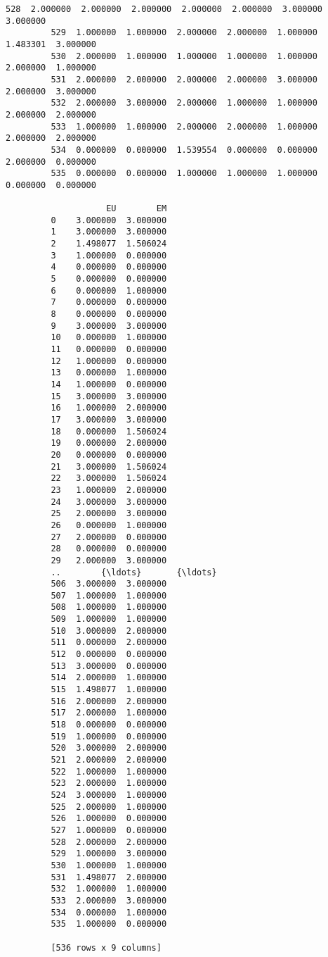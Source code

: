 \documentclass[11pt]{article}
\begin{document}
\begin{Verbatim}[commandchars=\\\{\}]
         528  2.000000  2.000000  2.000000  2.000000  2.000000  3.000000  3.000000   
         529  1.000000  1.000000  2.000000  2.000000  1.000000  1.483301  3.000000   
         530  2.000000  1.000000  1.000000  1.000000  1.000000  2.000000  1.000000   
         531  2.000000  2.000000  2.000000  2.000000  3.000000  2.000000  3.000000   
         532  2.000000  3.000000  2.000000  1.000000  1.000000  2.000000  2.000000   
         533  1.000000  1.000000  2.000000  2.000000  1.000000  2.000000  2.000000   
         534  0.000000  0.000000  1.539554  0.000000  0.000000  2.000000  0.000000   
         535  0.000000  0.000000  1.000000  1.000000  1.000000  0.000000  0.000000   
         
                    EU        EM  
         0    3.000000  3.000000  
         1    3.000000  3.000000  
         2    1.498077  1.506024  
         3    1.000000  0.000000  
         4    0.000000  0.000000  
         5    0.000000  0.000000  
         6    0.000000  1.000000  
         7    0.000000  0.000000  
         8    0.000000  0.000000  
         9    3.000000  3.000000  
         10   0.000000  1.000000  
         11   0.000000  0.000000  
         12   1.000000  0.000000  
         13   0.000000  1.000000  
         14   1.000000  0.000000  
         15   3.000000  3.000000  
         16   1.000000  2.000000  
         17   3.000000  3.000000  
         18   0.000000  1.506024  
         19   0.000000  2.000000  
         20   0.000000  0.000000  
         21   3.000000  1.506024  
         22   3.000000  1.506024  
         23   1.000000  2.000000  
         24   3.000000  3.000000  
         25   2.000000  3.000000  
         26   0.000000  1.000000  
         27   2.000000  0.000000  
         28   0.000000  0.000000  
         29   2.000000  3.000000  
         ..        {\ldots}       {\ldots}  
         506  3.000000  3.000000  
         507  1.000000  1.000000  
         508  1.000000  1.000000  
         509  1.000000  1.000000  
         510  3.000000  2.000000  
         511  0.000000  2.000000  
         512  0.000000  0.000000  
         513  3.000000  0.000000  
         514  2.000000  1.000000  
         515  1.498077  1.000000  
         516  2.000000  2.000000  
         517  2.000000  1.000000  
         518  0.000000  0.000000  
         519  1.000000  0.000000  
         520  3.000000  2.000000  
         521  2.000000  2.000000  
         522  1.000000  1.000000  
         523  2.000000  1.000000  
         524  3.000000  1.000000  
         525  2.000000  1.000000  
         526  1.000000  0.000000  
         527  1.000000  0.000000  
         528  2.000000  2.000000  
         529  1.000000  3.000000  
         530  1.000000  1.000000  
         531  1.498077  2.000000  
         532  1.000000  1.000000  
         533  2.000000  3.000000  
         534  0.000000  1.000000  
         535  1.000000  0.000000  
         
         [536 rows x 9 columns]
\end{Verbatim}
            
\end{document}
